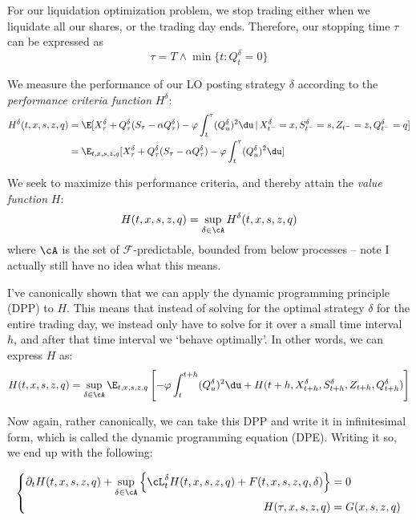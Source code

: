 \documentclass[12pt]{article}
\begin{document}
For our liquidation optimization problem, we stop trading either when we liquidate all our shares, or the trading day ends. Therefore, our stopping time $\tau$ can be expressed as 
\[ \tau = T \wedge \min \{ t: Q_t^\delta = 0 \} \]

We measure the performance of our LO posting strategy $\delta$ according to the \textit{performance criteria function} $H^\delta$:
\begin{align*}
H^\delta (t,x,s,z,q) & = \E [ X_\tau^\delta + Q_\tau^\delta(S_\tau - \alpha Q_\tau^\delta) - \varphi \int_t^\tau (Q_u^\delta)^2 \du \, | \, X_{t^-}^\delta = x, S_{t^-}^\delta = s, Z_{t^-} = z, Q_{t^-}^\delta = q] \\
& = \E_{t,x,s,z,q} [ X_\tau^\delta + Q_\tau^\delta(S_\tau - \alpha Q_\tau^\delta) - \varphi \int_t^\tau (Q_u^\delta)^2 \du ]
\end{align*} 

We seek to maximize this performance criteria, and thereby attain the \textit{value function} $H$:
\[ H(t,x,s,z,q) = \sup_{\delta \in \cA} H^\delta (t,x,s,z,q) \]
where $\cA$ is the set of $\mathcal{F}$-predictable, bounded from below processes -- note I actually still have no idea what this means.

I've canonically shown that we can apply the dynamic programming principle (DPP) to $H$. This means that instead of solving for the optimal strategy $\delta$ for the entire trading day, we instead only have to solve for it over a small time interval $h$, and after that time interval we `behave optimally'. In other words, we can express $H$ as:
\[ H(t,x,s,z,q) = \sup_{\delta \in \cA} \E_{t,x,s,z,q} \left[ -\varphi \int_t^{t+h} (Q_u^\delta)^2 \du + H(t+h, X_{t+h}^\delta, S_{t+h}^\delta, Z_{t+h}, Q_{t+h}^\delta) \right] \]

Now again, rather canonically, we can take this DPP and write it in infinitesimal form, which is called the dynamic programming equation (DPE). Writing it so, we end up with the following:

\begin{equation}\label{eq:dpe}
\begin{split}
\left\lbrace \begin{aligned}
\partial_t H (t,x,s,z,q) + \sup\limits_{\delta \in \cA} \left\lbrace \cL^{\delta}_t H(t,x,s,z,q) + F(t,x,s,z,q,\delta) \right\rbrace & = 0 \\
H(\tau,x,s,z,q) & = G(x,s,z,q) 
\end{aligned} \right.
\end{split}
\end{equation}
\end{document}
